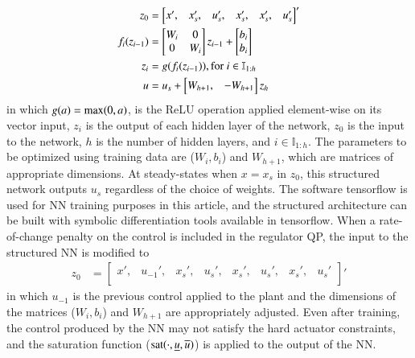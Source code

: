 \documentclass[preprint,5p, twocolumn, authoryear]{elsarticle}
\newcommand{\bbI}{\mathbb{I}}
\begin{document}
\begin{align*}
z_0 &= \begin{bmatrix}
    x', & x_s', & u_s', & x_s', & x_s', & u_s'
    \end{bmatrix}'\\
    f_i(z_{i-1}) &= \begin{bmatrix}
        W_i & 0 \\
        0 & W_i
          \end{bmatrix}z_{i-1}  + \begin{bmatrix}
            b_i \\
            b_i
            \end{bmatrix} \\
    z_i &= g(f_i(z_{i-1})), \textnormal{for} \ i \in \bbI_{1:h} \\
    u &= u_s + \begin{bmatrix}
  W_{h + 1}, & -W_{h + 1} \\
    \end{bmatrix} z_h \\
\end{align*}
in which $g(a) = \textnormal{max} (0, a)$,
is the ReLU operation applied element-wise on its vector input,
$z_i$ is the output of each hidden layer
of the network, $z_0$ is the input to the network, 
$h$ is the number of hidden layers, 
and $i \in \bbI_{1:h}$. 
The parameters to be optimized using 
training data are ($W_i, b_i$) 
and $W_{h+1}$, which are matrices 
of appropriate dimensions.
At steady-states
when $x=x_s$ in $z_0$, this structured network
outputs $u_s$ regardless of the choice of weights.
The software tensorflow 
\citep{abadi:agarwal:barham:brevdo:et-al:2015} is used 
for NN training purposes in this article,
and the structured architecture can be built 
with symbolic differentiation tools available in tensorflow.
When a rate-of-change penalty on the control 
is included in the regulator QP, 
the input to the structured NN is modified to 
\begin{align*}
    z_0 &= 
    \begin{bmatrix}
    x', & u_{-1}', & x_s', & u_s', & x_s', & u_s', & x_s', & u_s' \\
    \end{bmatrix}'
\end{align*}
in which $u_{-1}$ is the previous control applied 
to the plant and the dimensions of the matrices 
($W_i, b_i$) and $W_{h+1}$ 
are appropriately adjusted. Even after 
training, the control produced by 
the NN may not satisfy the hard actuator constraints,
and the saturation function 
($\textnormal{sat}(\cdot, \underline{u}, \overline{u})$) 
is applied to the output of the NN.
\end{document}
